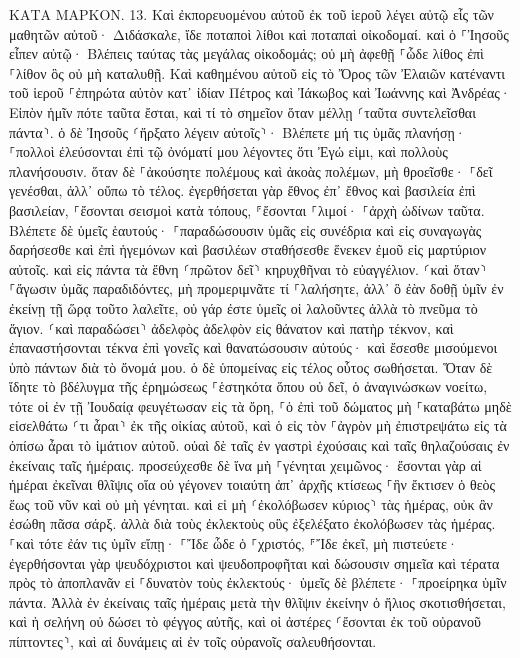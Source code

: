 \documentclass[twoside, 9pt]{extreport}
\begin{document}
ΚΑΤΑ ΜΑΡΚΟΝ.
13.
Καὶ ἐκπορευομένου αὐτοῦ ἐκ τοῦ ἱεροῦ λέγει αὐτῷ εἷς τῶν μαθητῶν αὐτοῦ· Διδάσκαλε, ἴδε ποταποὶ λίθοι καὶ ποταπαὶ οἰκοδομαί. 
καὶ ὁ ⸀Ἰησοῦς εἶπεν αὐτῷ· Βλέπεις ταύτας τὰς μεγάλας οἰκοδομάς; οὐ μὴ ἀφεθῇ ⸀ὧδε λίθος ἐπὶ ⸀λίθον ὃς οὐ μὴ καταλυθῇ. 
Καὶ καθημένου αὐτοῦ εἰς τὸ Ὄρος τῶν Ἐλαιῶν κατέναντι τοῦ ἱεροῦ ⸀ἐπηρώτα αὐτὸν κατ᾽ ἰδίαν Πέτρος καὶ Ἰάκωβος καὶ Ἰωάννης καὶ Ἀνδρέας· 
Εἰπὸν ἡμῖν πότε ταῦτα ἔσται, καὶ τί τὸ σημεῖον ὅταν μέλλῃ ⸂ταῦτα συντελεῖσθαι πάντα⸃. 
ὁ δὲ Ἰησοῦς ⸂ἤρξατο λέγειν αὐτοῖς⸃· Βλέπετε μή τις ὑμᾶς πλανήσῃ· 
⸀πολλοὶ ἐλεύσονται ἐπὶ τῷ ὀνόματί μου λέγοντες ὅτι Ἐγώ εἰμι, καὶ πολλοὺς πλανήσουσιν. 
ὅταν δὲ ⸀ἀκούσητε πολέμους καὶ ἀκοὰς πολέμων, μὴ θροεῖσθε· ⸀δεῖ γενέσθαι, ἀλλ᾽ οὔπω τὸ τέλος. 
ἐγερθήσεται γὰρ ἔθνος ἐπ᾽ ἔθνος καὶ βασιλεία ἐπὶ βασιλείαν, ⸀ἔσονται σεισμοὶ κατὰ τόπους, ⸁ἔσονται ⸀λιμοί· ⸀ἀρχὴ ὠδίνων ταῦτα. 
Βλέπετε δὲ ὑμεῖς ἑαυτούς· ⸀παραδώσουσιν ὑμᾶς εἰς συνέδρια καὶ εἰς συναγωγὰς δαρήσεσθε καὶ ἐπὶ ἡγεμόνων καὶ βασιλέων σταθήσεσθε ἕνεκεν ἐμοῦ εἰς μαρτύριον αὐτοῖς. 
καὶ εἰς πάντα τὰ ἔθνη ⸂πρῶτον δεῖ⸃ κηρυχθῆναι τὸ εὐαγγέλιον. 
⸂καὶ ὅταν⸃ ⸀ἄγωσιν ὑμᾶς παραδιδόντες, μὴ προμεριμνᾶτε τί ⸀λαλήσητε, ἀλλ᾽ ὃ ἐὰν δοθῇ ὑμῖν ἐν ἐκείνῃ τῇ ὥρᾳ τοῦτο λαλεῖτε, οὐ γάρ ἐστε ὑμεῖς οἱ λαλοῦντες ἀλλὰ τὸ πνεῦμα τὸ ἅγιον. 
⸂καὶ παραδώσει⸃ ἀδελφὸς ἀδελφὸν εἰς θάνατον καὶ πατὴρ τέκνον, καὶ ἐπαναστήσονται τέκνα ἐπὶ γονεῖς καὶ θανατώσουσιν αὐτούς· 
καὶ ἔσεσθε μισούμενοι ὑπὸ πάντων διὰ τὸ ὄνομά μου. ὁ δὲ ὑπομείνας εἰς τέλος οὗτος σωθήσεται. 
Ὅταν δὲ ἴδητε τὸ βδέλυγμα τῆς ἐρημώσεως ⸀ἑστηκότα ὅπου οὐ δεῖ, ὁ ἀναγινώσκων νοείτω, τότε οἱ ἐν τῇ Ἰουδαίᾳ φευγέτωσαν εἰς τὰ ὄρη, 
⸀ὁ ἐπὶ τοῦ δώματος μὴ ⸀καταβάτω μηδὲ εἰσελθάτω ⸂τι ἆραι⸃ ἐκ τῆς οἰκίας αὐτοῦ, 
καὶ ὁ εἰς τὸν ⸀ἀγρὸν μὴ ἐπιστρεψάτω εἰς τὰ ὀπίσω ἆραι τὸ ἱμάτιον αὐτοῦ. 
οὐαὶ δὲ ταῖς ἐν γαστρὶ ἐχούσαις καὶ ταῖς θηλαζούσαις ἐν ἐκείναις ταῖς ἡμέραις. 
προσεύχεσθε δὲ ἵνα μὴ ⸀γένηται χειμῶνος· 
ἔσονται γὰρ αἱ ἡμέραι ἐκεῖναι θλῖψις οἵα οὐ γέγονεν τοιαύτη ἀπ᾽ ἀρχῆς κτίσεως ⸀ἣν ἔκτισεν ὁ θεὸς ἕως τοῦ νῦν καὶ οὐ μὴ γένηται. 
καὶ εἰ μὴ ⸂ἐκολόβωσεν κύριος⸃ τὰς ἡμέρας, οὐκ ἂν ἐσώθη πᾶσα σάρξ. ἀλλὰ διὰ τοὺς ἐκλεκτοὺς οὓς ἐξελέξατο ἐκολόβωσεν τὰς ἡμέρας. 
⸀καὶ τότε ἐάν τις ὑμῖν εἴπῃ· ⸀Ἴδε ὧδε ὁ ⸀χριστός, ⸁Ἴδε ἐκεῖ, μὴ πιστεύετε· 
ἐγερθήσονται γὰρ ψευδόχριστοι καὶ ψευδοπροφῆται καὶ δώσουσιν σημεῖα καὶ τέρατα πρὸς τὸ ἀποπλανᾶν εἰ ⸀δυνατὸν τοὺς ἐκλεκτούς· 
ὑμεῖς δὲ βλέπετε· ⸀προείρηκα ὑμῖν πάντα. 
Ἀλλὰ ἐν ἐκείναις ταῖς ἡμέραις μετὰ τὴν θλῖψιν ἐκείνην ὁ ἥλιος σκοτισθήσεται, καὶ ἡ σελήνη οὐ δώσει τὸ φέγγος αὐτῆς, 
καὶ οἱ ἀστέρες ⸂ἔσονται ἐκ τοῦ οὐρανοῦ πίπτοντες⸃, καὶ αἱ δυνάμεις αἱ ἐν τοῖς οὐρανοῖς σαλευθήσονται. 
\end{document}
